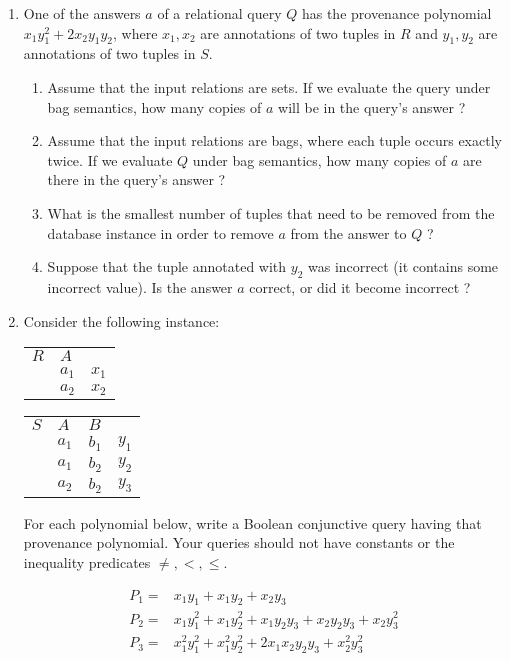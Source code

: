 \documentclass[12pt]{article}
\newcounter{query}
\begin{document}
\begin{enumerate}
\item One of the answers $a$ of a relational query $Q$ has the
  provenance polynomial $x_1 y_1^2 + 2 x_2 y_1y_2$, where $x_1, x_2$
  are annotations of two tuples in $R$ and $y_1,y_2$ are annotations
  of two tuples in $S$.

  \begin{enumerate}
  \item Assume that the input relations are sets.  If we evaluate the
    query under bag semantics, how many copies of $a$ will be in the
    query's answer ?
  \item Assume that the input relations are bags, where each tuple
    occurs exactly twice.  If we evaluate $Q$ under bag semantics, how
    many copies of $a$ are there in the query's answer ?
  \item What is the smallest number of tuples that need to be removed
    from the database instance in order to remove $a$ from the answer
    to $Q$ ?
  \item Suppose that the tuple annotated with $y_2$ was incorrect (it
    contains some incorrect value).  Is the answer $a$ correct, or did
    it become incorrect ?
  \end{enumerate}


\item Consider the following instance:

\begin{tabular}{l|l|l} \cline{2-2}
$R$   & $A$ & \\ \cline{2-2}
       & $a_1$ & $x_1$ \\
       & $a_2$ & $x_2$ \\ \cline{2-2}
\end{tabular}
\begin{tabular}{l|l|l|l} \cline{2-3}
$S$   & $A$ & $B$ &  \\ \cline{2-3}
      & $a_1$ & $b_1$ & $y_1$ \\
      & $a_1$ & $b_2$ & $y_2$  \\
      & $a_2$ & $b_2$ & $y_3$  \\ \cline{2-3}
\end{tabular}

For each polynomial below, write a Boolean conjunctive query having
that provenance polynomial.  Your queries should not have constants or
the inequality predicates $\neq, <, \leq$.

\begin{align*}
  P_1 = & x_1y_1 + x_1y_2 + x_2y_3 \\
  P_2 = & x_1y_1^2 + x_1 y_2^2 + x_1 y_2y_3  + x_2 y_2y_3 + x_2 y_3^2 \\
  P_3 = & x_1^2y_1^2 + x_1^2 y_2^2 + 2 x_1x_2y_2y_3 + x_2^2 y_3^2
\end{align*}


\end{enumerate}
\end{document}
